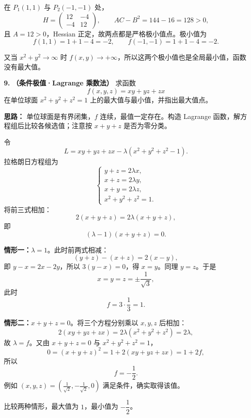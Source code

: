 在 \(P_1(1,1)\) 与 \(P_2(-1,-1)\) 处，
\[
H=\begin{pmatrix}12&-4\\-4&12\end{pmatrix},
\qquad
AC-B^2=144-16=128>0,
\]
且 \(A=12>0\)，Hessian 正定，故两点都是严格极小值点。极小值为
\[
f(1,1)=1+1-4=-2,\qquad f(-1,-1)=1+1-4=-2.
\]

又当 \(x^2+y^2\to\infty\) 时 \(f(x,y)\to+\infty\)，所以这两个极小值也是全局最小值，函数没有最大值。

\else \answerarea[10] \fi%

\textbf{9.} \textbf{（条件极值·Lagrange 乘数法）} 求函数
\[
f(x,y,z)=xy+yz+zx
\]
在单位球面 \(x^2+y^2+z^2=1\) 上的最大值与最小值，并指出最大值点。

\ifshowsolutions%
\textbf{思路：} 单位球面是有界闭集，\(f\) 连续，最值一定存在。构造 Lagrange 函数，解方程组后比较各候选值；注意按 \(x+y+z\) 是否为零分类。

令
\[
L=xy+yz+zx-\lambda(x^2+y^2+z^2-1).
\]
拉格朗日方程组为
\[
\begin{cases}
y+z=2\lambda x,\\
x+z=2\lambda y,\\
x+y=2\lambda z,\\
x^2+y^2+z^2=1.
\end{cases}
\]
将前三式相加：
\[
2(x+y+z)=2\lambda(x+y+z),
\]
即
\[
(\lambda-1)(x+y+z)=0.
\]

\textbf{情形一：}\(\lambda=1\)。此时前两式相减：
\[
(y+z)-(x+z)=2(x-y),
\]
即 \(y-x=2x-2y\)，所以 \(3(y-x)=0\)，得 \(x=y\)。同理 \(y=z\)。于是
\[
x=y=z=\pm\frac1{\sqrt3},
\]
此时
\[
f=3\cdot\frac13=1.
\]

\textbf{情形二：}\(x+y+z=0\)。将三个方程分别乘以 \(x,y,z\) 后相加：
\[
2(xy+yz+zx)=2\lambda(x^2+y^2+z^2)=2\lambda,
\]
故 \(\lambda=f\)。又由 \(x+y+z=0\) 与 \(x^2+y^2+z^2=1\)，
\[
0=(x+y+z)^2=1+2(xy+yz+zx)=1+2f,
\]
所以
\[
f=-\frac12.
\]
例如 \((x,y,z)=\left(\frac1{\sqrt2},-\frac1{\sqrt2},0\right)\) 满足条件，确实取得该值。

比较两种情形，最大值为 \(1\)，最小值为 \(-\dfrac12\)。

\else \answerarea[10] \fi%

